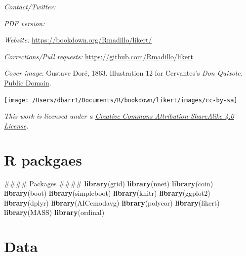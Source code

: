 \documentclass[]{book}
\newenvironment{Shaded}{\begin{snugshade}}{\end{snugshade}}
\newcommand{\KeywordTok}[1]{\textcolor[rgb]{0.13,0.29,0.53}{\textbf{{#1}}}}
\newcommand{\NormalTok}[1]{{#1}}
\begin{document}
\emph{Contact/Twitter:} \citet{healthstatsdude}

\emph{PDF version:}

\emph{Website:} \url{https://bookdown.org/Rmadillo/likert/}

\emph{Corrections/Pull requests:}
\url{https://github.com/Rmadillo/likert}

\emph{Cover image}: Gustave Doré, 1863. Illustration 12 for Cervantes's
\emph{Don Quixote}.
\href{https://commons.wikimedia.org/w/index.php?curid=677913}{Public
Domain}.

\texttt{[image: /Users/dbarr1/Documents/R/bookdown/likert/images/cc-by-sa]}

\emph{This work is licensed under a
\href{https://creativecommons.org/licenses/by-sa/4.0/}{Creative Commons
Attribution-ShareAlike 4.0 License}.}

\section*{R packgaes}\label{r-packgaes}

\begin{Shaded}
\begin{Highlighting}[]
\NormalTok{#### Packages ####}
\KeywordTok{library}\NormalTok{(grid)}
\KeywordTok{library}\NormalTok{(nnet)}
\KeywordTok{library}\NormalTok{(coin)}
\KeywordTok{library}\NormalTok{(boot)}
\KeywordTok{library}\NormalTok{(simpleboot)}
\KeywordTok{library}\NormalTok{(knitr)}
\KeywordTok{library}\NormalTok{(ggplot2)}
\KeywordTok{library}\NormalTok{(dplyr)}
\KeywordTok{library}\NormalTok{(AICcmodavg)}
\KeywordTok{library}\NormalTok{(polycor)}
\KeywordTok{library}\NormalTok{(likert)}
\KeywordTok{library}\NormalTok{(MASS)}
\KeywordTok{library}\NormalTok{(ordinal)}
\end{Highlighting}
\end{Shaded}

\section*{Data}\label{data}
\end{document}
